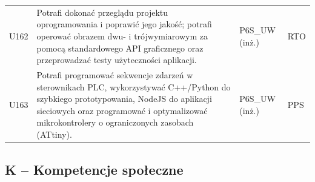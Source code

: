 \documentclass[12pt,a4paper]{article}
\begin{document}
{\begin{longtable}{m{1cm}m{8.8cm}m{2.1cm}m{2.5cm}}
\rowcolor{tableRowAlt} U162 & Potrafi dokonać przeglądu projektu oprogramowania i poprawić jego jakość; potrafi operować obrazem dwu- i trójwymiarowym za pomocą standardowego API graficznego oraz przeprowadzać testy użyteczności aplikacji. & {\scriptsize P6S\_UW {\scriptsize (inż.)}} & {\scriptsize RTO} \\
\rowcolor{tableRowLight} U163 & Potrafi programować sekwencje zdarzeń w sterownikach PLC, wykorzystywać C++/Python do szybkiego prototypowania, NodeJS do aplikacji sieciowych oraz programować i optymalizować mikrokontrolery o ograniczonych zasobach (ATtiny). & {\scriptsize P6S\_UW {\scriptsize (inż.)}} & {\scriptsize PPS} \\
\bottomrule
\end{longtable}}

\subsection*{K -- Kompetencje społeczne}
\end{document}
